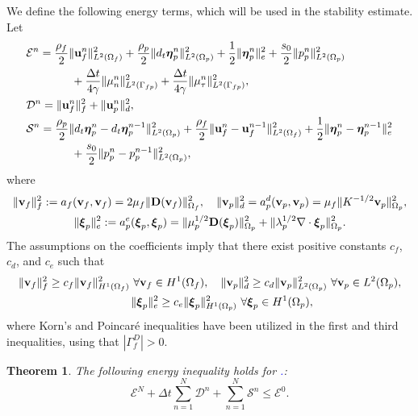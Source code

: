 \documentclass[11pt]{article}
\def\u{{\bf u}}
\def\bv{{\bf v}}
\def\bbeta{\boldsymbol{\eta}}
\def\bxi{\boldsymbol{\xi}}
\def\D{{\bf D}}
\def\grad{\nabla}
\def\div{\grad\cdot}
\def\O{\Omega}
\def\dt{d_t}
\newtheorem{theorem}{Theorem}[section]
\begin{document}
We define the following energy terms, which will be used in the stability estimate.
Let
%
\begin{align}
  & \mathcal{E}^n = \frac{\rho_f}{2}\|\u_f^n\|_{L^2(\O_f)}^2 + \frac{\rho_p}{2}\|\dt\bbeta_{p}^n\|_{L^2(\O_p)}^2 + \frac{1}{2}\|\bbeta_p^n\|_e^2
  + \frac{s_0}{2}\|p_{p}^n\|_{L^2(\O_p)}^2
  \nonumber \\
  & \qquad\qquad
  + \frac{\Delta t}{4\gamma}\|\mu_n^n\|_{L^2(\Gamma_{fp})}^2
  + \frac{\Delta t}{4\gamma}\|\mu_\tau^n\|_{L^2(\Gamma_{fp})}^2, \label{En-energy} \\
  & \mathcal{D}^n = \|\u_{f}^n\|_f^2 + \|\u_{p}^n\|_d^2, \label{Dn-energy}\\
  & \mathcal{S}^n = \frac{\rho_p}{2}\|\dt\bbeta_{p}^n-\dt\bbeta_{p}^{n-1}\|_{L^2(\O_p)}^2 
+\frac{\rho_f}{2}\|\u_f^n-\u_f^{n-1}\|_{L^2(\O_f)}^2 
+ \frac{1}{2} \|\bbeta_{p}^n-\bbeta_{p}^{n-1}\|_e^2
\nonumber \\
& \qquad\qquad
+ \frac{s_0}{2} \|p_{p}^n-p_{p}^{n-1}\|_{L^2(\O_p)}^2, \label{Sn-energy}
\end{align}
%
where
%
\begin{gather*}
\|\bv_f\|_f^2 := a_f(\bv_f,\bv_f) = 2\mu_f\|\D(\bv_{f})\|_{\O_{f}}^2, \quad
\|\bv_p\|_d^2 = a^d_{p}(\bv_p,\bv_p) = \mu_f\|K^{-1/2}\bv_p\|_{\O_p}^2, \\
\|\bxi_p\|_e^2 := a^e_{p}(\bxi_p,\bxi_p) = \|\mu_p^{1/2}\D(\bxi_p)\|_{\O_p}^2
+ \|\lambda_p^{1/2}\div\bxi_p\|_{\O_p}^2.
\end{gather*}
%
The assumptions on the coefficients imply that there exist positive constants $c_f$, $c_d$, and $c_e$ such that
%
\begin{equation}\label{coercivity}
  \begin{split}
& \|\bv_f\|_f^2 \ge c_f\|\bv_f\|_{H^1(\O_f)}^2 \ \forall \bv_f \in H^1(\O_f), \quad
\|\bv_p\|_d^2 \ge c_d\|\bv_p\|_{L^2(\O_p)}^2 \ \forall \bv_p \in L^2(\O_p), \\
& \hskip 3.5cm \|\bxi_p\|_e^2 \ge c_e\|\bxi_p\|_{H^1(\O_p)}^2 \ \forall \bxi_p \in H^1(\O_p),
\end{split}
\end{equation}
%
where Korn's and Poincar\'e inequalities have been utilized in the first and third inequalities, using that $|\Gamma_f^D| > 0$.

{
\begin{theorem}\label{stability}
The following energy inequality holds for \textcolor{blue}{.}:  
%
\begin{equation}\label{energy}
\mathcal{E}^N + \Delta t \sum_{n=1}^N \mathcal{D}^n + \sum_{n=1}^N \mathcal{S}^n \le \mathcal{E}^0.
\end{equation}
\end{theorem}
}
\end{document}
